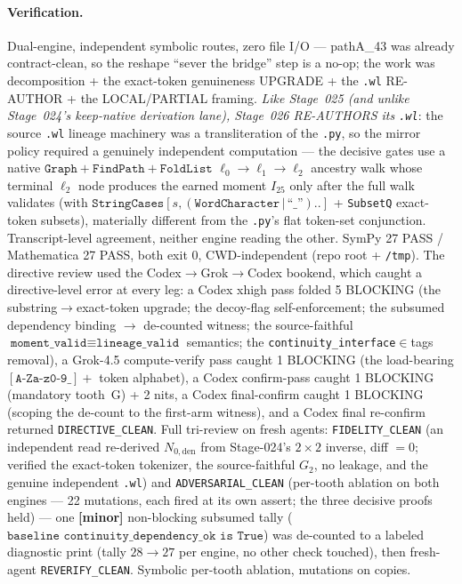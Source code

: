 \paragraph{Verification.}
Dual-engine, independent symbolic routes, zero file I/O --- pathA\_43 was already contract-clean, so the reshape
``sever the bridge'' step is a no-op; the work was decomposition + the exact-token genuineness UPGRADE + the
\texttt{.wl} RE-AUTHOR + the LOCAL/PARTIAL framing. \emph{Like Stage~025 (and unlike Stage~024's keep-native
derivation lane), Stage~026 RE-AUTHORS its \texttt{.wl}}: the source \texttt{.wl} lineage machinery was a
transliteration of the \texttt{.py}, so the mirror policy required a genuinely independent computation --- the
decisive gates use a native \(\texttt{Graph}+\texttt{FindPath}+\texttt{FoldList}\) \(\ell_0\!\to\!\ell_1\!\to\!\ell_2\)
ancestry walk whose terminal \(\ell_2\) node produces the earned moment \(I_{25}\) only after the full walk
validates (with \(\texttt{StringCases}[s,(\texttt{WordCharacter}\,|\,\text{``\_''})..]\) + \texttt{SubsetQ}
exact-token subsets), materially different from the \texttt{.py}'s flat token-set conjunction. Transcript-level
agreement, neither engine reading the other. SymPy 27 PASS / Mathematica 27 PASS, both exit 0, CWD-independent
(repo root + \texttt{/tmp}). The directive review used the Codex\(\to\)Grok\(\to\)Codex bookend, which caught a
directive-level error at every leg: a Codex xhigh pass folded 5 BLOCKING (the substring\(\to\)exact-token
upgrade; the decoy-flag self-enforcement; the subsumed dependency binding \(\to\) de-counted witness; the
source-faithful \(\texttt{moment\_valid}\equiv\texttt{lineage\_valid}\) semantics; the \texttt{continuity\_interface}\(\in\)tags
removal), a Grok-4.5 compute-verify pass caught 1 BLOCKING (the load-bearing \([\texttt{A-Za-z0-9\_}]+\) token
alphabet), a Codex confirm-pass caught 1 BLOCKING (mandatory tooth~G) + 2 nits, a Codex final-confirm caught 1
BLOCKING (scoping the de-count to the first-arm witness), and a Codex final re-confirm returned
\texttt{DIRECTIVE\_CLEAN}. Full tri-review on fresh agents: \texttt{FIDELITY\_CLEAN} (an independent read
re-derived \(N_{0,\mathrm{den}}\) from Stage-024's \(2\times2\) inverse, diff \(=0\); verified the exact-token
tokenizer, the source-faithful \(G_2\), no leakage, and the genuine independent \texttt{.wl}) and
\texttt{ADVERSARIAL\_CLEAN} (per-tooth ablation on both engines --- 22 mutations, each fired at its own assert;
the three decisive proofs held) --- one \textbf{[minor]} non-blocking subsumed tally
(\(\texttt{baseline continuity\_dependency\_ok is True}\)) was de-counted to a labeled diagnostic print
(tally \(28\to27\) per engine, no other check touched), then fresh-agent \texttt{REVERIFY\_CLEAN}.
Symbolic per-tooth ablation, mutations on copies.

